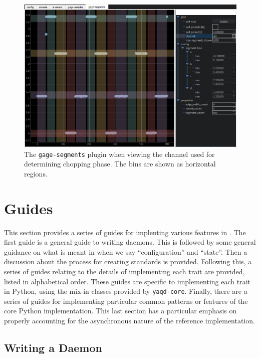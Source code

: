 \begin{landscape}
\begin{figure}
\includegraphics[width=8in]{"yaq/images/gage_segments_ai3"}
\caption[\yaqcqtpy{} Gage DAQ Plugin (chopping binning)]{
	The \texttt{gage-segments} plugin when viewing the channel used for determining chopping phase.
	The bins are shown as horizontal regions.
}
\label{yaq:fig:gage_segments_ai3}
\end{figure}
\end{landscape}



\clearpage

\section{Guides}

This section provides a series of guides for implenting various features in \yaq{}.
The first guide is a general guide to writing daemons.
This is followed by some general guidance on what is meant in \yaq{} when we say ``configuration'' and ``state''.
Then a discussion about the process for creating \yaq{} standards is provided.
Following this, a series of guides relating to the details of implementing each trait are provided, listed in alphabetical order.
These guides are specific to implementing each trait in Python, using the mix-in classes provided by \texttt{yaqd-core}.
Finally, there are a series of guides for implementing particular common patterns or features of the core Python implementation.
This last section has a particular emphasis on properly accounting for the asynchronous nature of the reference implementation.

\subsection{Writing a Daemon}

